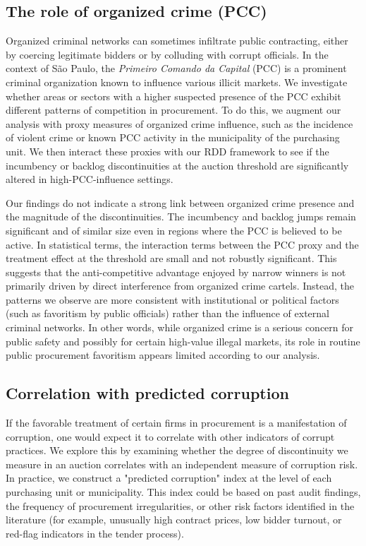 \subsection{The role of organized crime (PCC)}
Organized criminal networks can sometimes infiltrate public contracting, either by coercing legitimate bidders or by colluding with corrupt officials. In the context of São Paulo, the \emph{Primeiro Comando da Capital} (PCC) is a prominent criminal organization known to influence various illicit markets. We investigate whether areas or sectors with a higher suspected presence of the PCC exhibit different patterns of competition in procurement. To do this, we augment our analysis with proxy measures of organized crime influence, such as the incidence of violent crime or known PCC activity in the municipality of the purchasing unit. We then interact these proxies with our RDD framework to see if the incumbency or backlog discontinuities at the auction threshold are significantly altered in high-PCC-influence settings.

Our findings do not indicate a strong link between organized crime presence and the magnitude of the discontinuities. The incumbency and backlog jumps remain significant and of similar size even in regions where the PCC is believed to be active. In statistical terms, the interaction terms between the PCC proxy and the treatment effect at the threshold are small and not robustly significant. This suggests that the anti-competitive advantage enjoyed by narrow winners is not primarily driven by direct interference from organized crime cartels. Instead, the patterns we observe are more consistent with institutional or political factors (such as favoritism by public officials) rather than the influence of external criminal networks. In other words, while organized crime is a serious concern for public safety and possibly for certain high-value illegal markets, its role in routine public procurement favoritism appears limited according to our analysis.

\subsection{Correlation with predicted corruption}
If the favorable treatment of certain firms in procurement is a manifestation of corruption, one would expect it to correlate with other indicators of corrupt practices. We explore this by examining whether the degree of discontinuity we measure in an auction correlates with an independent measure of corruption risk. In practice, we construct a "predicted corruption" index at the level of each purchasing unit or municipality. This index could be based on past audit findings, the frequency of procurement irregularities, or other risk factors identified in the literature (for example, unusually high contract prices, low bidder turnout, or red-flag indicators in the tender process). 

